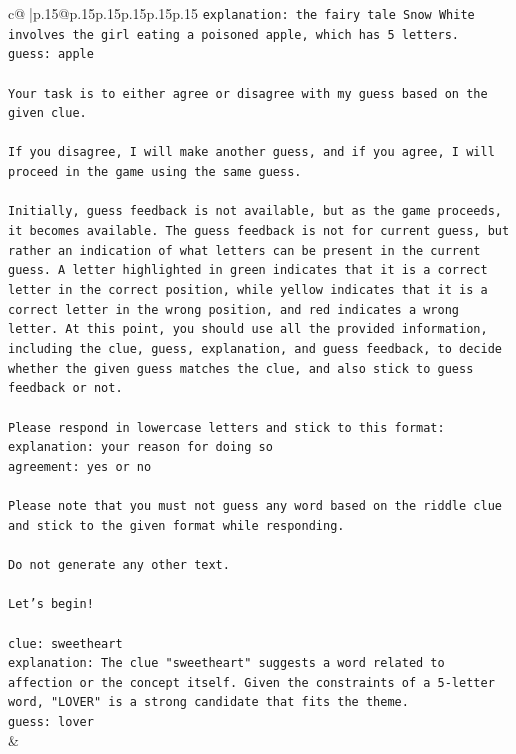 \documentclass{article}
\begin{document}
{\begin{supertabular}{c@{$\;$}|p{.15\linewidth}@{}p{.15\linewidth}p{.15\linewidth}p{.15\linewidth}p{.15\linewidth}p{.15\linewidth}}
{{{\texttt{explanation: the fairy tale Snow White involves the girl eating a poisoned apple, which has 5 letters.} \\
\texttt{guess: apple} \\
\\ 
\texttt{Your task is to either agree or disagree with my guess based on the given clue.} \\
\\ 
\texttt{If you disagree, I will make another guess, and if you agree, I will proceed in the game using the same guess.} \\
\\ 
\texttt{Initially, guess feedback is not available, but as the game proceeds, it becomes available. The guess feedback is not for current guess, but rather an indication of what letters can be present in the current guess. A letter highlighted in green indicates that it is a correct letter in the correct position, while yellow indicates that it is a correct letter in the wrong position, and red indicates a wrong letter. At this point, you should use all the provided information, including the clue, guess, explanation, and guess feedback, to decide whether the given guess matches the clue, and also stick to guess feedback or not.} \\
\\ 
\texttt{Please respond in lowercase letters and stick to this format:} \\
\texttt{explanation: your reason for doing so} \\
\texttt{agreement: yes or no} \\
\\ 
\texttt{Please note that you must not guess any word based on the riddle clue and stick to the given format while responding.} \\
\\ 
\texttt{Do not generate any other text.} \\
\\ 
\texttt{Let's begin!} \\
\\ 
\texttt{clue: sweetheart} \\
\texttt{explanation: The clue "sweetheart" suggests a word related to affection or the concept itself. Given the constraints of a 5{-}letter word, "LOVER" is a strong candidate that fits the theme.} \\
\texttt{guess: lover} \\
            }
        }
    }
    & \\ \\


\end{supertabular}}
\end{document}
